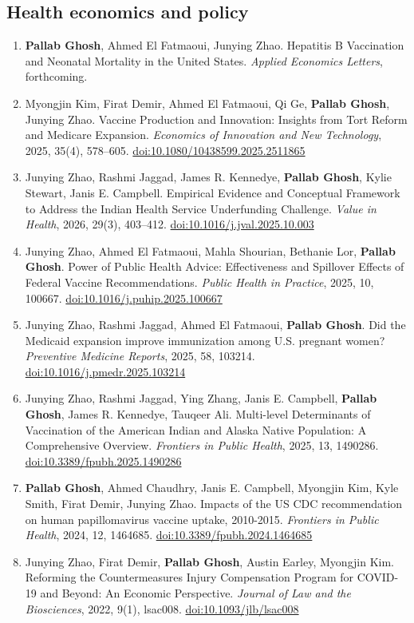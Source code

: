 \documentclass[10.5pt]{article}
\begin{document}
\subsection{Health economics and policy}
\begin{enumerate}[start=14]
\item \textbf{Pallab Ghosh}, Ahmed El Fatmaoui, Junying Zhao. Hepatitis B Vaccination and Neonatal Mortality in the United States. \emph{Applied Economics Letters}, forthcoming.
\item Myongjin Kim, Firat Demir, Ahmed El Fatmaoui, Qi Ge, \textbf{Pallab Ghosh}, Junying Zhao. Vaccine Production and Innovation: Insights from Tort Reform and Medicare Expansion. \emph{Economics of Innovation and New Technology}, 2025, 35(4), 578--605. \href{https://doi.org/10.1080/10438599.2025.2511865}{doi:10.1080/10438599.2025.2511865}
\item Junying Zhao, Rashmi Jaggad, James R. Kennedye, \textbf{Pallab Ghosh}, Kylie Stewart, Janis E. Campbell. Empirical Evidence and Conceptual Framework to Address the Indian Health Service Underfunding Challenge. \emph{Value in Health}, 2026, 29(3), 403--412. \href{https://doi.org/10.1016/j.jval.2025.10.003}{doi:10.1016/j.jval.2025.10.003}
\item Junying Zhao, Ahmed El Fatmaoui, Mahla Shourian, Bethanie Lor, \textbf{Pallab Ghosh}. Power of Public Health Advice: Effectiveness and Spillover Effects of Federal Vaccine Recommendations. \emph{Public Health in Practice}, 2025, 10, 100667. \href{https://doi.org/10.1016/j.puhip.2025.100667}{doi:10.1016/j.puhip.2025.100667}
\item Junying Zhao, Rashmi Jaggad, Ahmed El Fatmaoui, \textbf{Pallab Ghosh}. Did the Medicaid expansion improve immunization among U.S. pregnant women? \emph{Preventive Medicine Reports}, 2025, 58, 103214. \href{https://doi.org/10.1016/j.pmedr.2025.103214}{doi:10.1016/j.pmedr.2025.103214}
\item Junying Zhao, Rashmi Jaggad, Ying Zhang, Janis E. Campbell, \textbf{Pallab Ghosh}, James R. Kennedye, Tauqeer Ali. Multi-level Determinants of Vaccination of the American Indian and Alaska Native Population: A Comprehensive Overview. \emph{Frontiers in Public Health}, 2025, 13, 1490286. \href{https://doi.org/10.3389/fpubh.2025.1490286}{doi:10.3389/fpubh.2025.1490286}
\item \textbf{Pallab Ghosh}, Ahmed Chaudhry, Janis E. Campbell, Myongjin Kim, Kyle Smith, Firat Demir, Junying Zhao. Impacts of the US CDC recommendation on human papillomavirus vaccine uptake, 2010-2015. \emph{Frontiers in Public Health}, 2024, 12, 1464685. \href{https://doi.org/10.3389/fpubh.2024.1464685}{doi:10.3389/fpubh.2024.1464685}
\item Junying Zhao, Firat Demir, \textbf{Pallab Ghosh}, Austin Earley, Myongjin Kim. Reforming the Countermeasures Injury Compensation Program for COVID-19 and Beyond: An Economic Perspective. \emph{Journal of Law and the Biosciences}, 2022, 9(1), lsac008. \href{https://doi.org/10.1093/jlb/lsac008}{doi:10.1093/jlb/lsac008}
\end{enumerate}
\end{document}
